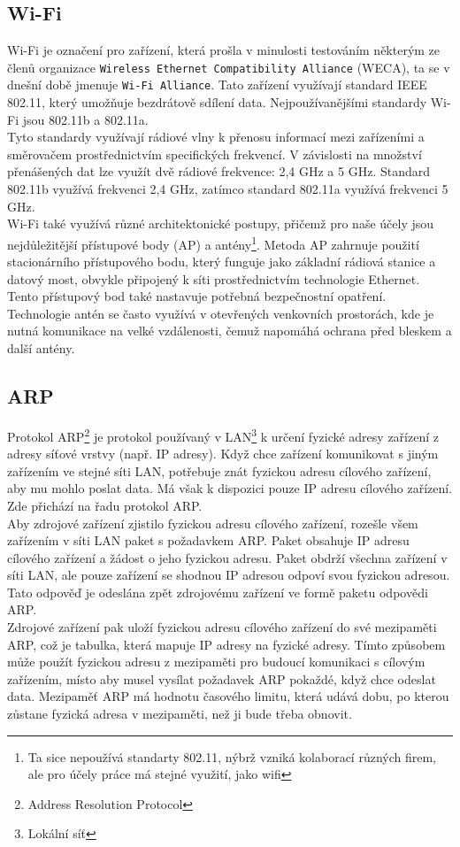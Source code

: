 \documentclass[12pt]{report}			%
\begin{document}
				\subsection{Wi-Fi}

Wi-Fi je označení pro zařízení, která prošla v minulosti testováním některým ze členů organizace \texttt{Wireless Ethernet Compatibility Alliance} (WECA), ta se v dnešní době jmenuje \texttt{Wi-Fi Alliance}. Tato zařízení využívají standard IEEE 802.11, který umožňuje bezdrátově sdílení data. Nejpoužívanějšími standardy Wi-Fi jsou 802.11b a 802.11a.
\\
Tyto standardy využívají rádiové vlny k přenosu informací mezi zařízeními a směrovačem prostřednictvím specifických frekvencí. V závislosti na množství přenášených dat lze využít dvě rádiové frekvence: 2,4 GHz a 5 GHz. Standard 802.11b využívá frekvenci 2,4 GHz, zatímco standard 802.11a využívá frekvenci 5 GHz.
\\
Wi-Fi také využívá různé architektonické postupy, přičemž pro naše účely jsou nejdůležitější přístupové body (AP) a antény\footnote{Ta sice nepoužívá standarty 802.11, nýbrž vzniká kolaborací různých firem, ale pro účely práce má stejné využití, jako wifi}. Metoda AP zahrnuje použití stacionárního přístupového bodu, který funguje jako základní rádiová stanice a datový most, obvykle připojený k síti prostřednictvím technologie Ethernet. Tento přístupový bod také nastavuje potřebná bezpečnostní opatření.
\\
Technologie antén se často využívá v otevřených venkovních prostorách, kde je nutná komunikace na velké vzdálenosti, čemuž napomáhá ochrana před bleskem a další antény.\cite{WiFi1}\cite{WiFi2}\cite{WiFi3}\cite{Pruvodce}
				\subsection{ARP}
Protokol ARP\footnote{Address Resolution Protocol} je protokol používaný v LAN\footnote{Lokální síť} k určení fyzické adresy zařízení z adresy síťové vrstvy (např. IP adresy). Když chce zařízení komunikovat s jiným zařízením ve stejné síti LAN, potřebuje znát fyzickou adresu cílového zařízení, aby mu mohlo poslat data. Má však k dispozici pouze IP adresu cílového zařízení. Zde přichází na řadu protokol ARP.
\\
Aby zdrojové zařízení zjistilo fyzickou adresu cílového zařízení, rozešle všem zařízením v síti LAN paket s požadavkem ARP. Paket obsahuje IP adresu cílového zařízení a žádost o jeho fyzickou adresu. Paket obdrží všechna zařízení v síti LAN, ale pouze zařízení se shodnou IP adresou odpoví svou fyzickou adresou. Tato odpověď je odeslána zpět zdrojovému zařízení ve formě paketu odpovědi ARP.
\\
Zdrojové zařízení pak uloží fyzickou adresu cílového zařízení do své mezipaměti ARP, což je tabulka, která mapuje IP adresy na fyzické adresy. Tímto způsobem může použít fyzickou adresu z mezipaměti pro budoucí komunikaci s cílovým zařízením, místo aby musel vysílat požadavek ARP pokaždé, když chce odeslat data. Mezipaměť ARP má hodnotu časového limitu, která udává dobu, po kterou zůstane fyzická adresa v mezipaměti, než ji bude třeba obnovit.\cite{arp1}\cite{arp2}\cite{arp3}
\end{document}
